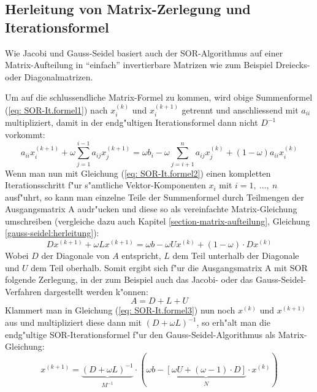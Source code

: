 \begin{refsection}
\subsection{Herleitung von Matrix-Zerlegung und Iterationsformel \label{subsec: SOR-Herleitung}}
Wie Jacobi und Gauss-Seidel basiert auch der SOR-Algorithmus auf einer
Matrix-Aufteilung in ``einfach'' invertierbare Matrizen wie zum Beispiel
Dreiecks- oder Diagonalmatrizen.

Um auf die schlussendliche Matrix-Formel zu kommen, wird obige
Summenformel (\ref{eq: SOR-It.formel1}) nach $x_i^{(k)}$ und $x_i^{(k+1)}$
getrennt und anschliessend mit $a_{ii}$ multipliziert, damit in der
endg"ultigen Iterationsformel dann nicht $D^{-1}$ vorkommt:
\begin{equation} \label{eq: SOR-It.formel2}
	a_{ii}x_i^{(k+1)} %
	+\omega %
	\sum\limits_{j=1}^{i-1} a_{ij}x_j^{(k+1)} %
 = \omega b_i- \omega %
 \sum\limits_{j=i+1}^n a_{ij}x_j^{(k)} %
 +(1-\omega)	%
	a_{ii}x_i^{(k)} %
\end{equation}
Wenn man nun mit Gleichung (\ref{eq: SOR-It.formel2}) einen kompletten
Iterationsschritt f"ur s"amtliche Vektor-Komponenten $x_i$ mit $i=1,\
...,\ n$ ausf"uhrt, so kann man einzelne Teile der Summenformel
durch Teilmengen der Ausgangsmatrix A audr"ucken und diese so als
vereinfachte Matrix-Gleichung umschreiben (vergleiche dazu auch Kapitel
\ref{section-matrix-aufteilung}, Gleichung \ref{gauss-seidel:herleitung}):
\begin{equation} \label{eq: SOR-It.formel3}
Dx^{(k+1)}+\omega Lx^{(k+1)}=\omega b-\omega Ux^{(k)}+(1-\omega)\cdot Dx^{(k)}
\end{equation}
Wobei $D$ der Diagonale von $A$ entspricht, $L$ dem Teil unterhalb
der Diagonale und $U$ dem Teil oberhalb. Somit ergibt sich f"ur die
Ausgangsmatrix A mit SOR folgende Zerlegung, in der zum Beispiel auch
das Jacobi- oder das Gauss-Seidel-Verfahren dargestellt werden k"onnen:
\begin{equation} \label{eq: SOR Matrix-Splitting}
A=D+L+U
\end{equation}
Klammert man in Gleichung (\ref{eq: SOR-It.formel3}) nun noch $x^{(k)}$
und $x^{(k+1)}$ aus und multipliziert diese dann mit $(D+\omega
L)^{-1}$, so erh"alt man die endg"ultige SOR-Iterationsformel f"ur den
Gauss-Seidel-Algorithmus als Matrix-Gleichung:
\begin{equation} \label{eq: SOR-It.formel}
x^{(k+1)}=\underbrace{(D+\omega L)^{-1}}_{\substack{M^{-1}}}\cdot(\omega b-\underbrace{[\omega U+(\omega-1)\cdot D]}_{\substack{N}}\cdot x^{(k)})
\end{equation}
		

\end{refsection}
